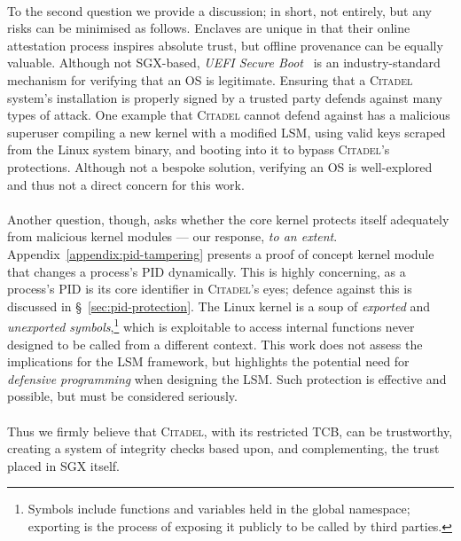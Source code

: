 \paragraph{} To the second question we provide a discussion; in short, not entirely, but any risks can be minimised as follows. Enclaves are unique in that their online attestation process inspires absolute trust, but offline provenance can be equally valuable. Although not SGX-based, \textit{UEFI Secure Boot}~\cite{Richardson2013UefiSB} is an industry-standard mechanism for verifying that an OS is legitimate. Ensuring that a \textsc{Citadel} system's installation is properly signed by a trusted party defends against many types of attack. One example that \textsc{Citadel} cannot defend against has a malicious superuser compiling a new kernel with a modified LSM, using valid keys scraped from the Linux system binary, and booting into it to bypass \textsc{Citadel}'s protections. Although not a bespoke solution, verifying an OS is well-explored and thus not a direct concern for this work.

\paragraph{} Another question, though, asks whether the core kernel protects itself adequately from malicious kernel modules --- our response, \textit{to an extent}. Appendix~\ref{appendix:pid-tampering} presents a proof of concept kernel module that changes a process's PID dynamically. This is highly concerning, as a process's PID is its core identifier in \textsc{Citadel}'s eyes; defence against this is discussed in §~\ref{sec:pid-protection}. The Linux kernel is a soup of \textit{exported} and \textit{unexported symbols},\footnote{Symbols include functions and variables held in the global namespace; exporting is the process of exposing it publicly to be called by third parties.} which is exploitable to access internal functions never designed to be called from a different context. This work does not assess the implications for the LSM framework, but highlights the potential need for \textit{defensive programming} when designing the LSM. Such protection is effective and possible, but must be considered seriously.

\paragraph{} Thus we firmly believe that \textsc{Citadel}, with its restricted TCB, can be trustworthy, creating a system of integrity checks based upon, and complementing, the trust placed in SGX itself.

